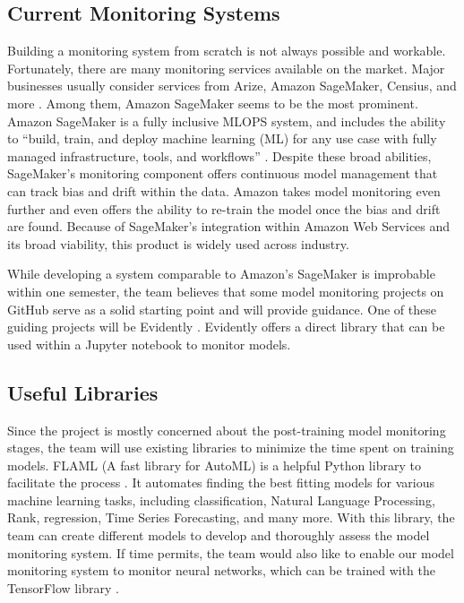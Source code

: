 \documentclass[
	letterpaper, %
	12pt, %
]{CSUniSchoolLabReport}
\begin{document}
\subsection{Current Monitoring Systems}
Building a monitoring system from scratch is not always possible and workable. Fortunately, there are many monitoring services available on the market. Major businesses usually consider services from Arize, Amazon SageMaker, Censius, and more \autocite{czakon_2022}. Among them, Amazon SageMaker seems to be the most prominent. Amazon SageMaker is a fully inclusive MLOPS system, and includes the ability to “build, train, and deploy machine learning (ML) for any use case with fully managed infrastructure, tools, and workflows” \autocite{mishra_2019}. Despite these broad abilities, SageMaker’s monitoring component offers continuous model management that can track bias and drift within the data. Amazon takes model monitoring even further and even offers the ability to re-train the model once the bias and drift are found. Because of SageMaker’s integration within Amazon Web Services and its broad viability, this product is widely used across industry. \par
While developing a system comparable to Amazon's SageMaker is improbable within one semester, the team believes that some model monitoring projects on GitHub serve as a solid starting point and will provide guidance. One of these guiding projects will be Evidently \autocite{czakon_2022}. Evidently offers a direct library that can be used within a Jupyter notebook to monitor models. 

\subsection{Useful Libraries}
Since the project is mostly concerned about the post-training model monitoring stages, the team will use existing libraries to minimize the time spent on training models. FLAML (A fast library for AutoML) is a helpful Python library to facilitate the process \autocite{flaml}. It automates finding the best fitting models for various machine learning tasks, including classification, Natural Language Processing, Rank, regression, Time Series Forecasting, and many more. With this library, the team can create different models to develop and thoroughly assess the model monitoring system. If time permits, the team would also like to enable our model monitoring system to monitor neural networks, which can be trained with the TensorFlow library \autocite{tensorflow}. \par
\end{document}
